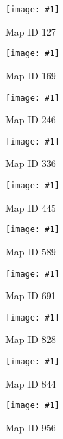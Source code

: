 \def\figw{0.092\columnwidth}%
\newcommand{\formatcaption}[1]{%
\tiny\begin{center}{#1}\end{center}}%
\newcommand{\includesnapshot}[2]{%
  \parbox{\figw}{\texttt{[image: \#1]}\\\vspace{-2.5ex}\formatcaption{#2}}}%
\includesnapshot{./exp-results/training-09x09-0127.png}{Map ID 127} 
\includesnapshot{./exp-results/training-09x09-0169.png}{Map ID 169} 
\includesnapshot{./exp-results/training-09x09-0246.png}{Map ID 246} 
\includesnapshot{./exp-results/training-09x09-0336.png}{Map ID 336} 
\includesnapshot{./exp-results/training-09x09-0445.png}{Map ID 445}
\includesnapshot{./exp-results/training-09x09-0589.png}{Map ID 589} 
\includesnapshot{./exp-results/training-09x09-0691.png}{Map ID 691} 
\includesnapshot{./exp-results/training-09x09-0828.png}{Map ID 828} 
\includesnapshot{./exp-results/training-09x09-0844.png}{Map ID 844} 
\includesnapshot{./exp-results/training-09x09-0956.png}{Map ID 956}
